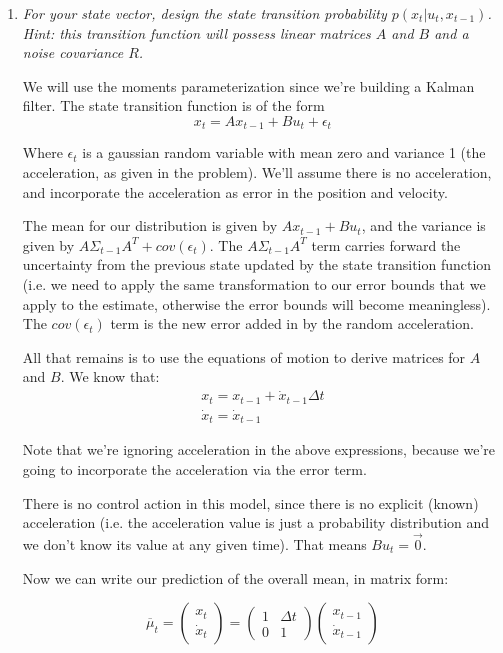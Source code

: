 \documentclass[10pt]{article}
\begin{document}
\begin{enumerate}
\begin{enumerate}
  \item \textit{For your state vector, design the state transition probability 
    $p(x_t | u_t,x_{t-1})$. Hint: this transition function will possess linear
  matrices $A$ and $B$ and a noise covariance $R$.}

  We will use the moments parameterization since we're building a Kalman filter.
  The state transition function is of the form
  $$x_t = A x_{t-1} + B u_t + \epsilon_t$$

  Where $\epsilon_t$ is a gaussian random variable with mean zero and variance 1
  (the acceleration, as given in the problem). We'll assume there is no
  acceleration, and incorporate the acceleration as error in the position and
  velocity.
 
  The mean for our distribution is given by $A x_{t-1} + B u_t$, and the
  variance is given by $A\Sigma_{t-1}A^T + cov(\epsilon_t)$. The
  $A\Sigma_{t-1}A^T$ term carries forward the uncertainty from the previous state
  updated by the state transition function (i.e. we need to apply the same
  transformation to our error bounds that we apply to the estimate, otherwise
  the error bounds will become meaningless). The $cov(\epsilon_t)$ term is the
  new error added in by the random acceleration.

  All that remains is to use the equations of motion to derive matrices for $A$
  and $B$. We know that:
  \begin{gather}
    x_t = x_{t-1} + \dot{x}_{t-1} \Delta t \\ 
    \dot{x}_t = \dot{x}_{t-1} 
  \end{gather}

  Note that we're ignoring acceleration in the above expressions, because we're
  going to incorporate the acceleration via the error term.

  There is no control action in this model, since there is no explicit (known)
  acceleration (i.e. the acceleration value is just a probability distribution
  and we don't know its value at any given time). That means $B u_t = \vec{0}$.

  Now we can write our prediction of the overall mean, in matrix form:

  $$
\overline{\mu}_t = \begin{pmatrix}x_t \\ \dot{x}_t\end{pmatrix} = 
\begin{pmatrix}1 & \Delta t \\ 0 & 1\end{pmatrix} \begin{pmatrix}x_{t-1} \\
\dot{x}_{t-1} \end{pmatrix}
  $$


\end{enumerate}
\end{enumerate}
\end{document}
